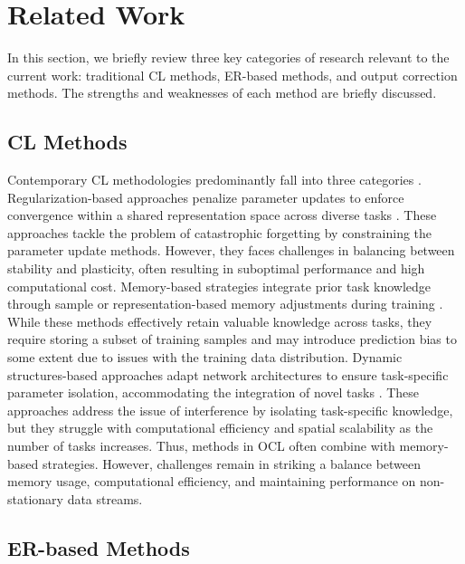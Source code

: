 \section{Related Work}
In this section, we briefly review three key categories of research relevant to the current work: traditional CL methods, ER-based methods, and output correction methods. The strengths and weaknesses of each method are briefly discussed.
\subsection{CL Methods}

Contemporary CL methodologies predominantly fall into three categories \cite{van2019three}. Regularization-based approaches penalize parameter updates to enforce convergence within a shared representation space across diverse tasks \cite{kirkpatrick2017overcoming,chaudhry2018riemannian,zenke2017continual}. These approaches tackle the problem of catastrophic forgetting by constraining the parameter update methods. However, they faces challenges in balancing between stability and plasticity, often resulting in suboptimal performance and high computational cost. Memory-based strategies integrate prior task knowledge through sample or representation-based memory adjustments during training \cite{lopez2017gradient,chaudhry2018efficient,shin2017continual,riemer2018learning,wang2022foster,bonicelli2022effectiveness}. While these methods effectively retain valuable knowledge across tasks, they require storing a subset of training samples and may introduce prediction bias to some extent due to issues with the training data distribution. Dynamic structures-based approaches adapt network architectures to ensure task-specific parameter isolation, accommodating the integration of novel tasks \cite{li2017learning,yoon2017lifelong,von2019continual,lomonaco2020rehearsal}.  These approaches address the issue of interference by isolating task-specific knowledge, but they struggle with computational efficiency and spatial scalability as the number of tasks increases. Thus, methods in OCL often combine with memory-based strategies. However, challenges remain in striking a balance between memory usage, computational efficiency, and maintaining performance on non-stationary data streams.


\subsection{ER-based Methods}

